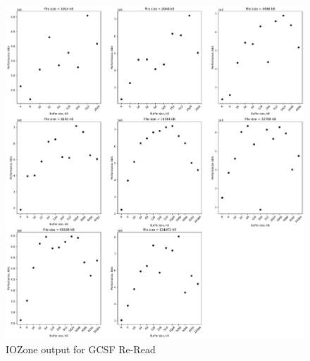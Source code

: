 \begin{figure}[!htb]
	\label{fig:bench_gcsf_re_read}
	\begin{center}
		\includegraphics[width=1.0\textwidth]{figures/benchmarking/gcsf/Re-Read.pdf}
	\end{center}
	\caption{IOZone output for GCSF \mbox{Re-Read}}
\end{figure}

